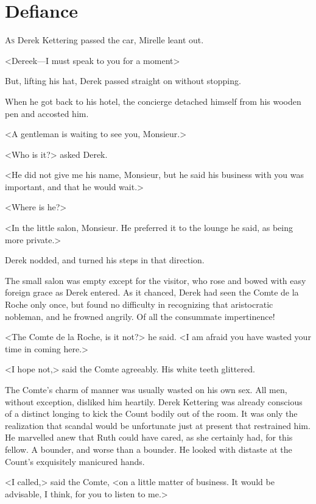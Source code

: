 \chapter{Defiance}



\lettrine{A}{s} Derek Kettering passed the car, Mirelle leant out.

\zz
<Dereek—I must speak to you for a moment\longdash>

\zz
But, lifting his hat, Derek passed straight on without stopping.

\zz
When he got back to his hotel, the concierge detached himself from his wooden pen and accosted him.

<A gentleman is waiting to see you, Monsieur.>

<Who is it?> asked Derek.

<He did not give me his name, Monsieur, but he said his business with you was important, and that he would wait.>

<Where is he?>

<In the little salon, Monsieur. He preferred it to the lounge he said, as being more private.>

Derek nodded, and turned his steps in that direction.

The small salon was empty except for the visitor, who rose and bowed with easy foreign grace as Derek entered. As it chanced, Derek had seen the Comte de la Roche only once, but found no difficulty in recognizing that aristocratic nobleman, and he frowned angrily. Of all the consummate impertinence!

<The Comte de la Roche, is it not?> he said. <I am afraid you have wasted your time in coming here.>

<I hope not,> said the Comte agreeably. His white teeth glittered.

The Comte's charm of manner was usually wasted on his own sex. All men, without exception, disliked him heartily. Derek Kettering was already conscious of a distinct longing to kick the Count bodily out of the room. It was only the realization that scandal would be unfortunate just at present that restrained him. He marvelled anew that Ruth could have cared, as she certainly had, for this fellow. A bounder, and worse than a bounder. He looked with distaste at the Count's exquisitely manicured hands.

<I called,> said the Comte, <on a little matter of business. It would be advisable, I think, for you to listen to me.>

